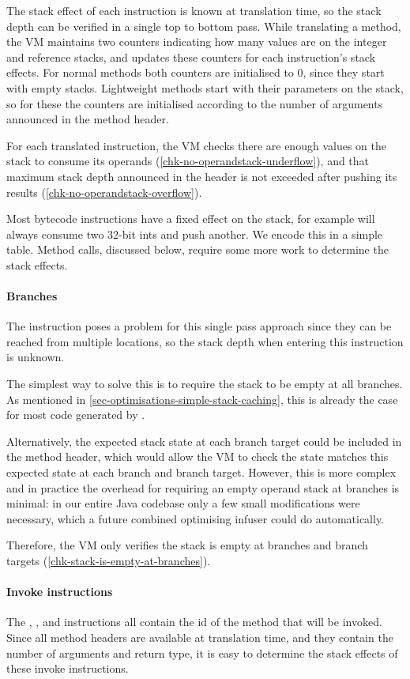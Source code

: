 The stack effect of each instruction is known at translation time, so the stack depth can be verified in a single top to bottom pass. While translating a method, the VM maintains two counters indicating how many values are on the integer and reference stacks, and updates these counters for each instruction's stack effects. For normal methods both counters are initialised to 0, since they start with empty stacks. Lightweight methods start with their parameters on the stack, so for these the counters are initialised according to the number of arguments announced in the method header.

For each translated instruction, the VM checks there are enough values on the stack to consume its operands (\ref{chk-no-operandstack-underflow}), and that maximum stack depth announced in the header is not exceeded after pushing its results (\ref{chk-no-operandstack-overflow}).

Most bytecode instructions have a fixed effect on the stack, for example  will always consume two 32-bit ints and push another. We encode this in a simple table. Method calls, discussed below, require some more work to determine the stack effects. 

\paragraph{Branches}
The  instruction poses a problem for this single pass approach since they can be reached from multiple locations, so the stack depth when entering this instruction is unknown.

The simplest way to solve this is to require the stack to be empty at all branches. As mentioned in \ref{sec-optimisations-simple-stack-caching}, this is already the case for most code generated by .

Alternatively, the expected stack state at each branch target could be included in the method header, which would allow the VM to check the state matches this expected state at each branch and branch target. However, this is more complex and in practice the overhead for requiring an empty operand stack at branches is minimal: in our entire Java codebase only a few small modifications were necessary, which a future combined optimising infuser could do automatically.

Therefore, the VM only verifies the stack is empty at branches and branch targets (\ref{chk-stack-is-empty-at-branches}).

\paragraph{Invoke instructions}
The , , and  instructions all contain the id of the method that will be invoked. Since all method headers are available at translation time, and they contain the number of arguments and return type, it is easy to determine the stack effects of these invoke instructions.
 
